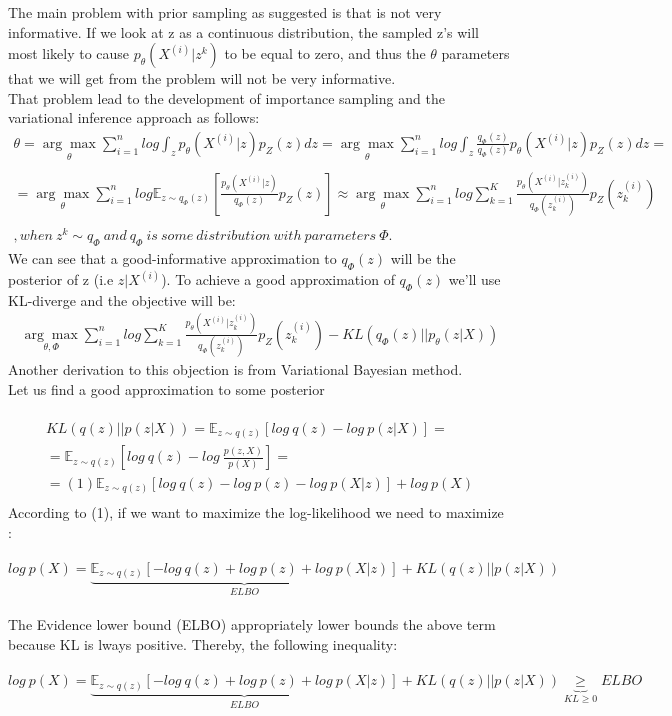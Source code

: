 The main problem with prior sampling as suggested is that is not very informative. If we look at z as a continuous distribution, the sampled z's will most likely to cause $p_{\theta}(X^{(i)}|z^{k})$ to be equal to zero, and thus the $\theta$ parameters that we will get from the problem will not be very informative. \\ That problem lead to the development of importance sampling and the variational inference approach as follows: 
\begin{gather*}
\theta=\underset{\theta}{\arg\max} \sum_{i=1}^{n}log \int_z p_{\theta}(X^{(i)}|z)p_{Z}(z)dz = \underset{\theta}{\arg\max} \sum_{i=1}^{n}log \int_z \frac{q_{\Phi}(z)}{q_{\Phi}(z)}p_{\theta}(X^{(i)}|z)p_{Z}(z)dz= \\ \\ = \underset{\theta}{\arg\max} \sum_{i=1}^{n}log \mathbb{E}_{z \sim q_{\Phi}(z)}[\frac{p_{\theta}(X^{(i)}|z)}{q_{\Phi}(z)}p_{Z}(z)] \approx \underset{\theta}{\arg\max} \sum_{i=1}^{n}log \sum_{k=1}^{K}\frac{p_{\theta}(X^{(i)}|z_{k}^{(i)})}{q_{\Phi}(z_{k}^{(i)})}p_{Z}(z_{k}^{(i)}) \\ \\ , when\ z^{k}\sim q_{\Phi} \ and \ q_{\Phi} \ is \ some \ distribution \ with \ parameters \ \Phi.
\end{gather*}
We can see that a good-informative approximation to $q_{\Phi}(z)$ will be the posterior of z (i.e $z|X^{(i)}$). To achieve a good approximation of $q_{\Phi}(z)$ we'll use KL-diverge and the objective will be: 
\begin{gather*}
\underset{\theta,\Phi}{\arg\max} \sum_{i=1}^{n}log \sum_{k=1}^{K}\frac{p_{\theta}(X^{(i)}|z_{k}^{(i)})}{q_{\Phi}(z_{k}^{(i)})}p_{Z}(z_{k}^{(i)}) - KL(q_{\Phi}(z)||p_{\theta}(z|X))
\end{gather*}
Another derivation to this objection is from Variational Bayesian method.\\
Let us find a good approximation to some posterior\\ \\
\begin{gather*}
KL(q(z)||p(z|X))=\mathbb{E}_{z \sim q(z)}[log \ q(z)-log \ p(z|X)] = \\  
= \mathbb{E}_{z \sim q(z)}[log \ q(z) - log \ \frac{p(z,X)}{p(X)}] = \\ 
=(1) \mathbb{E}_{z \sim q(z)}[log \ q(z) - log \ p(z) - log \ p(X|z)] + log \ p(X) \\ 
\end{gather*}
According to (1), if we want to maximize the log-likelihood we need to maximize : \\ \\
$log \ p(X) = \underbrace{\mathbb{E}_{z \sim q(z)}[-log \ q(z) + log \ p(z) + log \ p(X|z)]}_{ELBO}+KL(q(z)||p(z|X))$ \\ \\
The Evidence lower bound (ELBO) appropriately lower bounds the above term because KL is lways positive. Thereby, the following inequality: \\ \\
$log \ p(X) = \underbrace{\mathbb{E}_{z \sim q(z)}[-log \ q(z) + log \ p(z) + log \ p(X|z)]}_{ELBO}+KL(q(z)||p(z|X)) \underbrace{\geq}_{KL \geq 0} ELBO $ \\
